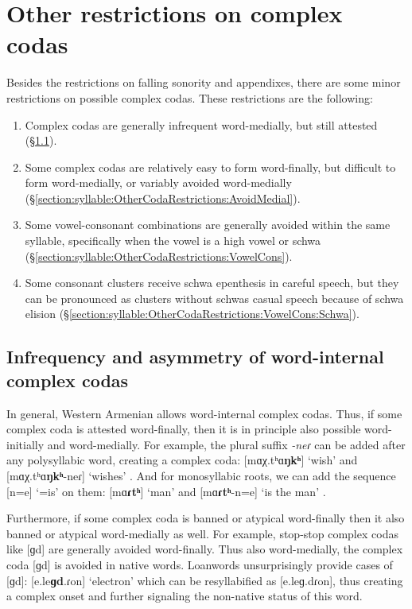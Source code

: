 	\section{Other restrictions on complex codas}\label{section:syllable:OtherCodaRestrictions}
	Besides the restrictions on falling sonority and appendixes, there are some minor restrictions on possible complex codas. These restrictions are the following:
	\begin{enumerate}[noitemsep, topsep= 0pt]
		\item Complex codas are generally infrequent word-medially, but still attested (\S\ref{section:syllable:OtherCodaRestrictions:Infrequent}). 
		\item Some complex codas are relatively easy to form word-finally, but difficult to form word-medially, or variably avoided word-medially   (\S\ref{section:syllable:OtherCodaRestrictions:AvoidMedial}). 
		\item Some vowel-consonant combinations are generally avoided within the same syllable, specifically when the vowel is a high vowel or schwa  (\S\ref{section:syllable:OtherCodaRestrictions:VowelCons}). 
		\item Some consonant clusters receive schwa epenthesis  in  careful speech, but they can be pronounced as clusters without schwas casual speech because of schwa elision  (\S\ref{section:syllable:OtherCodaRestrictions:VowelCons:Schwa}). 
		
	\end{enumerate}
	\subsection{Infrequency and asymmetry of word-internal complex codas}\label{section:syllable:OtherCodaRestrictions:Infrequent}
	In general, Western Armenian allows word-internal complex codas. Thus, if some complex coda is attested word-finally, then it is in principle also possible word-initially and word-medially. For example, the plural suffix \textit{-neɾ} can be added after any polysyllabic word, creating a complex coda:  [mɑχ.tʰɑ\textbf{ŋkʰ}] `wish' and [mɑχ.tʰɑ\textbf{ŋkʰ}-neɾ] `wishes' . And for monosyllabic roots, we can add the sequence [n=e] `{}=is' on them: [{mɑ\textbf{ɾtʰ}}] `man' and [mɑ\textbf{ɾtʰ}-n=e] `is the man' . 
	
	
	Furthermore, if some complex coda is banned or atypical word-finally then it also banned or atypical  word-medially as well. For example, stop-stop complex codas like [ɡd] are generally avoided word-finally. Thus also word-medially, the complex coda  [ɡd] is avoided in native words. Loanwords unsurprisingly provide  cases of [ɡd]: [e.le\textbf{ɡd}.ɾon] `electron'  which can be resyllabified as [e.leɡ.dɾon], thus creating a complex onset and  further signaling the non-native status of this word. 
	
